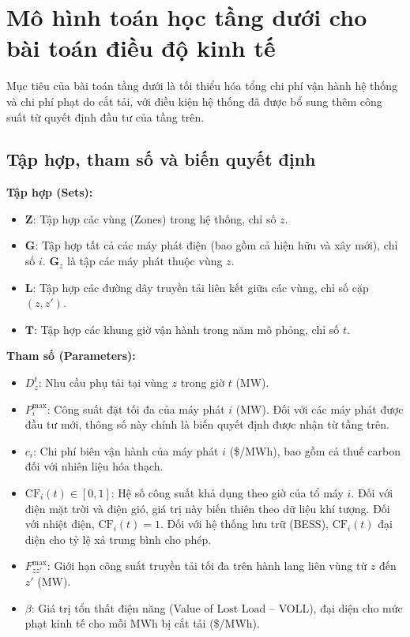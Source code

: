 \section{Mô hình toán học tầng dưới cho bài toán điều độ kinh tế}

Mục tiêu của bài toán tầng dưới là tối thiểu hóa tổng chi phí vận hành hệ thống và chi phí phạt do cắt tải, với điều kiện hệ thống đã được bổ sung thêm công suất từ quyết định đầu tư của tầng trên.

\subsection{Tập hợp, tham số và biến quyết định}

\textbf{Tập hợp (Sets):}
\begin{itemize}
    \item $\mathbf{Z}$: Tập hợp các vùng (Zones) trong hệ thống, chỉ số $z$.
    \item $\mathbf{G}$: Tập hợp tất cả các máy phát điện (bao gồm cả hiện hữu và xây mới), chỉ số $i$. $\mathbf{G}_z$ là tập các máy phát thuộc vùng $z$.
    \item $\mathbf{L}$: Tập hợp các đường dây truyền tải liên kết giữa các vùng, chỉ số cặp $(z, z')$.
    \item $\mathbf{T}$: Tập hợp các khung giờ vận hành trong năm mô phỏng, chỉ số $t$.
\end{itemize}

\textbf{Tham số (Parameters):}
\begin{itemize}
    \item $D_z^t$: Nhu cầu phụ tải tại vùng $z$ trong giờ $t$ (MW).
    \item $P_i^{\max}$: Công suất đặt tối đa của máy phát $i$ (MW). Đối với các máy phát được đầu tư mới, thông số này chính là biến quyết định được nhận từ tầng trên.
    \item $c_i$: Chi phí biên vận hành của máy phát $i$ (\$/MWh), bao gồm cả thuế carbon đối với nhiên liệu hóa thạch.
    \item $\text{CF}_i(t) \in [0, 1]$: Hệ số công suất khả dụng theo giờ của tổ máy $i$. Đối với điện mặt trời và điện gió, giá trị này biến thiên theo dữ liệu khí tượng. Đối với nhiệt điện, $\text{CF}_i(t) = 1$. Đối với hệ thống lưu trữ (BESS), $\text{CF}_i(t)$ đại diện cho tỷ lệ xả trung bình cho phép.
    \item $F_{zz'}^{\max}$: Giới hạn công suất truyền tải tối đa trên hành lang liên vùng từ $z$ đến $z'$ (MW).
    \item $\beta$: Giá trị tổn thất điện năng (Value of Lost Load -- VOLL), đại diện cho mức phạt kinh tế cho mỗi MWh bị cắt tải (\$/MWh).
\end{itemize}

